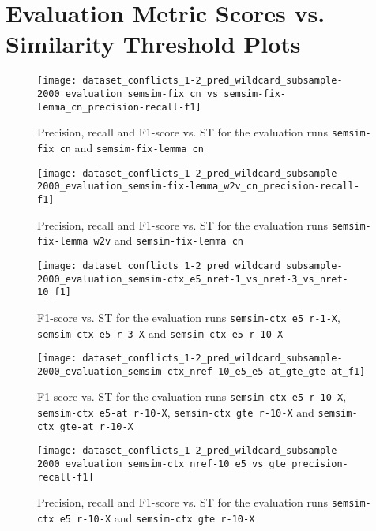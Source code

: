 \newpage
\section{Evaluation Metric Scores vs. Similarity Threshold Plots}
\label{app-sec:eval-metric-vs-st-plots}

\begin{figure}[H]
\centering
\texttt{[image: dataset\_conflicts\_1-2\_pred\_wildcard\_subsample-2000\_evaluation\_semsim-fix\_cn\_vs\_semsim-fix-lemma\_cn\_precision-recall-f1]}
\caption{Precision, recall and F1-score vs. ST for the evaluation runs \texttt{semsim-fix cn} and \texttt{semsim-fix-lemma cn}}
\label{fig:prec-rec-f1-semsim-fix-lemma}
\end{figure}

\begin{figure}[H]
\centering
\texttt{[image: dataset\_conflicts\_1-2\_pred\_wildcard\_subsample-2000\_evaluation\_semsim-fix-lemma\_w2v\_cn\_precision-recall-f1]}
\caption{Precision, recall and F1-score vs. ST for the evaluation runs \texttt{semsim-fix-lemma w2v} and \texttt{semsim-fix-lemma cn}}
\label{fig:prec-rec-f1-semxim-fix-lemma-model}
\end{figure}

\begin{figure}[H]
\centering
\texttt{[image: dataset\_conflicts\_1-2\_pred\_wildcard\_subsample-2000\_evaluation\_semsim-ctx\_e5\_nref-1\_vs\_nref-3\_vs\_nref-10\_f1]}
\caption{F1-score vs. ST for the evaluation runs \texttt{semsim-ctx e5 r-1-X}, \texttt{semsim-ctx e5 r-3-X} and \texttt{semsim-ctx e5 r-10-X}}
\label{fig:f1-semsim-ctx-nref}
\end{figure}

\begin{figure}[H]
\centering
\texttt{[image: dataset\_conflicts\_1-2\_pred\_wildcard\_subsample-2000\_evaluation\_semsim-ctx\_nref-10\_e5\_e5-at\_gte\_gte-at\_f1]}
\caption{F1-score vs. ST for the evaluation runs \texttt{semsim-ctx e5 r-10-X}, \texttt{semsim-ctx e5-at r-10-X}, \texttt{semsim-ctx gte r-10-X} and \texttt{semsim-ctx gte-at r-10-X}}
\label{fig:f1-semsim-ctx-model-at}
\end{figure}

\begin{figure}[H]
\centering
\texttt{[image: dataset\_conflicts\_1-2\_pred\_wildcard\_subsample-2000\_evaluation\_semsim-ctx\_nref-10\_e5\_vs\_gte\_precision-recall-f1]}
\caption{Precision, recall and F1-score vs. ST for the evaluation runs \texttt{semsim-ctx e5 r-10-X} and \texttt{semsim-ctx gte r-10-X}}
\label{fig:prec-rec-f1-semsim-ctx-model}
\end{figure}

